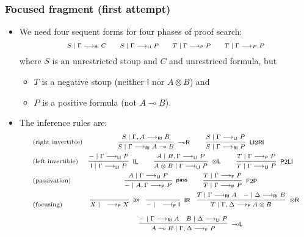 \documentclass[10pt,t]{beamer}
\newcommand{\I}{\mathsf{I}}
\newcommand{\ot}{\otimes}
\newcommand{\ax}{\mathsf{ax}}
\newcommand{\uf}{\mathsf{pass}}
\newcommand{\IL}{\I\mathsf{L}}
\newcommand{\otL}{\ot\mathsf{L}}
\newcommand{\IR}{\I\mathsf{R}}
\newcommand{\otR}{\ot\mathsf{R}}
\newcommand{\loL}{{\lo}\mathsf{L}}
\newcommand{\loR}{{\lo}\mathsf{R}}
\renewcommand{\vdash}{\longrightarrow}
\newcommand{\lo}{\multimap}
\newcommand{\lolli}{\lo}
\newcommand{\proofbox}[1]{\begin{tabular}{l} #1 \end{tabular}}
\newcommand{\LI}{\mathsf{LI}}
\newcommand{\F}{\mathsf{F}}
\newcommand{\Pass}{\mathsf{P}}
\newcommand{\RI}{\mathsf{RI}}
\begin{document}
\begin{frame}


\frametitle{Focused fragment (first attempt)}

\begin{itemize}

\item We need four sequent forms for four phases of proof search:
\[
\scriptsize
\begin{array}{c}
S \mid \Gamma \vdash_\RI C
\qquad S \mid \Gamma \vdash_\LI P
\qquad T \mid \Gamma \vdash_\Pass P
\qquad T \mid \Gamma \vdash_F P
\end{array}
\]
where $S$ is an unrestricted stoup and $C$ and unrestriced formula,
but 
\begin{itemize}
\item $T$ is a negative stoup (neither $\I$ nor $A \ot B$) and
\item $P$ is a positive formula (not $A \lo B$).
\end{itemize}

\item The inference rules are:
\[
\scriptsize
  \begin{array}{l@{}c}
    \text{(right invertible)} & %
    \proofbox{
    \infer[\loR]{S \mid \Gamma \vdash_{\RI} A \lolli B}{S \mid \Gamma , A \vdash_{\RI} B}
    \qquad
    \infer[\LI 2 \RI]{S \mid \Gamma \vdash_{\RI} P}{S \mid \Gamma \vdash_{\LI} P}
    }
    \\[9pt]
    \text{(left invertible)} & %
    \proofbox{
    \infer[\IL]{\I \mid \Gamma \vdash_{\LI} P}{{-} \mid \Gamma \vdash_{\LI} P}
    \qquad
    \infer[\otL]{A \ot B \mid \Gamma \vdash_{\LI} P}{A \mid B , \Gamma \vdash_{\LI} P}
    \qquad
    \infer[\Pass 2 \LI]{T \mid \Gamma \vdash_{\LI} P}{T \mid \Gamma \vdash_{\Pass} P}
    }
    \\[9pt]
    \text{(passivation)} & %
    \proofbox{
      \infer[\uf]{{-} \mid A , \Gamma \vdash_{\Pass} P }{
      A\mid \Gamma \vdash_{\LI} P
    }
    \qquad
    \infer[\F 2 \Pass]{T \mid \Gamma \vdash_{\Pass} P}{
      T \mid \Gamma \vdash_{\F} P
    }
    }
    \\[9pt]
    \text{(focusing)} &    %
    \hspace*{3mm}
    \infer[\ax]{X \mid \quad \vdash_{\F} X}{}
    \quad
    \infer[\IR]{{-} \mid \quad \vdash_{\F} \I}{} 
    \quad 
    \infer[\otR]{T \mid \Gamma , \Delta \vdash_{\F} A \ot B}{
      T \mid \Gamma \vdash_{\RI} A
      &
      {-} \mid \Delta \vdash_{\RI} B
    }
\\[9pt]
&
    \infer[\loL]{A \lolli B \mid \Gamma , \Delta \vdash_{\F} P}{
      {-} \mid \Gamma \vdash_{\RI} A
      &
      B \mid \Delta \vdash_{\LI} P
    }
   \end{array}
\]

\end{itemize}

\end{frame}
\end{document}
